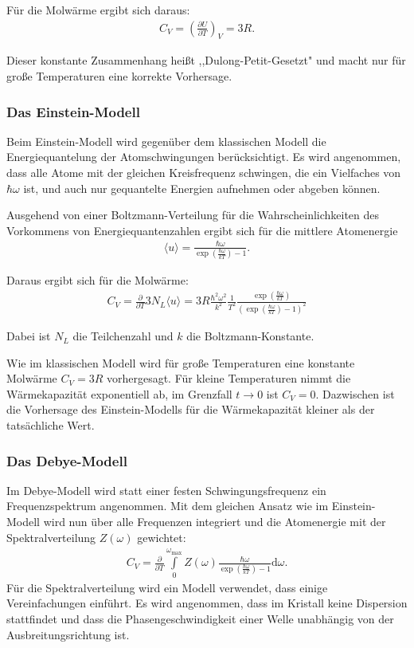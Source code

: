 Für die Molwärme ergibt sich daraus:
\begin{align}
	C_V = \left(\frac{\partial U}{\partial T}\right)_V = 3R.
\end{align}

Dieser konstante Zusammenhang heißt ,,Dulong-Petit-Gesetzt" und macht nur für große Temperaturen eine korrekte Vorhersage.

\subsubsection{Das Einstein-Modell}
Beim Einstein-Modell wird gegenüber dem klassischen Modell die Energiequantelung der Atomschwingungen berücksichtigt.
Es wird angenommen, dass alle Atome mit der gleichen Kreisfrequenz schwingen, die ein Vielfaches von $\hbar\omega$ ist, und auch nur gequantelte Energien aufnehmen oder abgeben können.

Ausgehend von einer Boltzmann-Verteilung für die Wahrscheinlichkeiten des Vorkommens von Energiequantenzahlen ergibt sich für die mittlere Atomenergie
\begin{align}
	\langle u \rangle = \frac{\hbar \omega}{\exp \left( \frac{\hbar \omega}{kT} \right)-1}.
\end{align}

Daraus ergibt sich für die Molwärme:
\begin{align}
	C_V = \frac{\partial}{\partial T} 3N_L \langle u \rangle = 3R \frac{\hbar^2 \omega^2}{k^2}\frac{1}{T^2}\frac{\exp \left(\frac{\hbar\omega}{k T}\right)}{\left(\exp\left(\frac{\hbar\omega}{k T}\right) - 1\right)^2}
\end{align}

Dabei ist $N_L$ die Teilchenzahl und $k$ die Boltzmann-Konstante.

Wie im klassischen Modell wird für große Temperaturen eine konstante Molwärme $C_V = 3R$ vorhergesagt.
Für kleine Temperaturen nimmt die Wärmekapazität exponentiell ab, im Grenzfall $t \rightarrow 0$ ist $C_V = 0$.
Dazwischen ist die Vorhersage des Einstein-Modells für die Wärmekapazität kleiner als der tatsächliche Wert.

\subsubsection{Das Debye-Modell}

Im Debye-Modell wird statt einer festen Schwingungsfrequenz ein Frequenzspektrum angenommen.
Mit dem gleichen Ansatz wie im Einstein-Modell wird nun über alle Frequenzen integriert und die Atomenergie mit der Spektralverteilung $Z(\omega)$ gewichtet:
\begin{align}
	\label{debye1}
	C_V = \frac{\partial}{\partial T} \int\limits_{0}^{\omega_\mathrm{max}} Z(\omega) \frac{\hbar \omega}{\exp \left( \frac{\hbar \omega}{kT} \right)-1} \mathrm{d}\omega.
\end{align}
Für die Spektralverteilung wird ein Modell verwendet, dass einige Vereinfachungen einführt.
Es wird angenommen, dass im Kristall keine Dispersion stattfindet und dass die Phasengeschwindigkeit einer Welle unabhängig von der Ausbreitungsrichtung ist.

